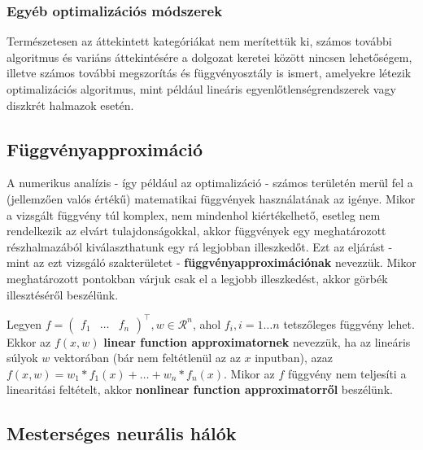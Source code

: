 \subsubsection{Egyéb optimalizációs módszerek}
Természetesen az áttekintett kategóriákat nem merítettük ki, számos további algoritmus és variáns áttekintésére a dolgozat keretei között nincsen lehetőségem, illetve számos további megszorítás és függvényosztály is ismert, amelyekre létezik optimalizációs algoritmus, mint például lineáris egyenlőtlenségrendszerek vagy diszkrét halmazok esetén.

\subsection{Függvényapproximáció}

A numerikus analízis - így például az optimalizáció - számos területén merül fel a (jellemzően valós értékű) matematikai függvények használatának az igénye. Mikor a vizsgált függvény túl komplex, nem mindenhol kiértékelhető, esetleg nem rendelkezik az elvárt tulajdonságokkal, akkor függvények egy meghatározott részhalmazából kiválaszthatunk egy rá legjobban illeszkedőt. Ezt az eljárást - mint az ezt vizsgáló szakterületet - \textbf{függvényapproximációnak} nevezzük. Mikor meghatározott pontokban várjuk csak el a legjobb illeszkedést, akkor görbék illesztéséről beszélünk.


Legyen $f = \left(\begin{smallmatrix}f_1 & \ldots & f_n\end{smallmatrix}\right)^\top, w \in \mathcal{R}^n$, ahol $f_i, i=1 \ldots n$ tetszőleges függvény lehet. Ekkor az $f(x, w)$ \textbf{linear function approximatornek} nevezzük, ha az lineáris súlyok $w$ vektorában (bár nem feltétlenül az az $x$ inputban), azaz $f(x,w) = w_1*f_1(x) + \ldots + w_n*f_n(x)$. Mikor az $f$ függvény nem teljesíti a linearitási feltételt, akkor \textbf{nonlinear function approximatorről} beszélünk.

\subsection{Mesterséges neurális hálók}

